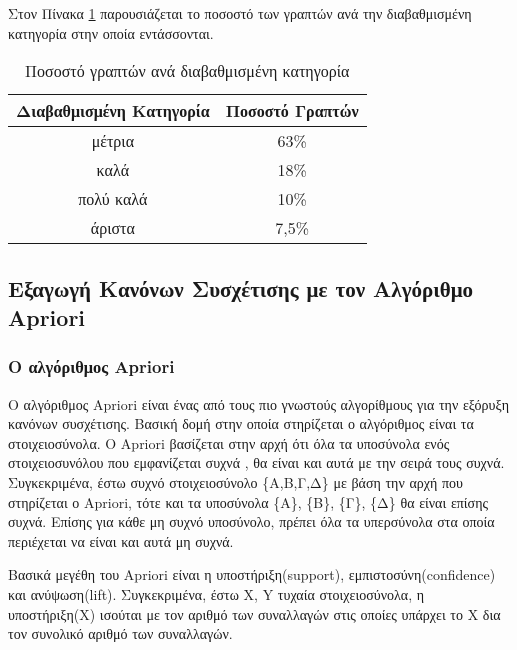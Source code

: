 \documentclass[12pt,a4paper,final]{article}
\begin{document}
Στον Πίνακα \ref{table:percent} παρουσιάζεται το ποσοστό των γραπτών ανά την διαβαθμισμένη κατηγορία στην οποία εντάσσονται.
\begin{table}[h]
\centering
\begin{tabular}{|c|c|}
\hline 
Διαβαθμισμένη Κατηγορία & Ποσοστό Γραπτών \\ 
\hline 
μέτρια & 63\% \\ 
\hline 
καλά & 18\% \\ 
\hline 
πολύ καλά & 10\% \\ 
\hline 
άριστα & 7,5\% \\ 
\hline 
\end{tabular}
\caption{Ποσοστό γραπτών ανά διαβαθμισμένη κατηγορία} 
\label{table:percent}
\end{table} 



\subsection{Εξαγωγή Κανόνων Συσχέτισης με τον Αλγόριθμο \foreignlanguage{english}{Apriori}}
	\subsubsection{Ο αλγόριθμος \foreignlanguage{english}{Apriori}}
Ο αλγόριθμος \foreignlanguage{english}{Apriori} \cite{assoc_agrawal} είναι ένας από τους πιο γνωστούς αλγορίθμους για την εξόρυξη κανόνων συσχέτισης. Βασική δομή στην οποία στηρίζεται ο αλγόριθμος είναι τα στοιχειοσύνολα.  Ο \foreignlanguage{english}{Apriori} βασίζεται στην αρχή ότι όλα τα υποσύνολα ενός στοιχειοσυνόλου που εμφανίζεται συχνά  , θα είναι και αυτά με την σειρά τους συχνά.
Συγκεκριμένα, έστω συχνό στοιχειοσύνολο \{Α,Β,Γ,Δ\} με βάση την αρχή που στηρίζεται ο \foreignlanguage{english}{Apriori}, τότε  και τα υποσύνολα \{Α\}, \{Β\}, \{Γ\}, \{Δ\} θα είναι επίσης συχνά. Επίσης για κάθε μη συχνό υποσύνολο, πρέπει όλα τα υπερσύνολα στα οποία περιέχεται να είναι και αυτά μη συχνά.  \bigskip

Βασικά μεγέθη του \foreignlanguage{english}{Apriori} είναι η υποστήριξη(\foreignlanguage{english}{support}), εμπιστοσύνη(\foreignlanguage{english}{confidence}) και ανύψωση(\foreignlanguage{english}{lift}). Συγκεκριμένα, έστω \foreignlanguage{english}{X}, \foreignlanguage{english}{Y} τυχαία στοιχειοσύνολα, η υποστήριξη(\foreignlanguage{english}{X}) ισούται με τον αριθμό των συναλλαγών στις οποίες υπάρχει το  \foreignlanguage{english}{X} δια τον συνολικό αριθμό των συναλλαγών.\bigskip
\end{document}
